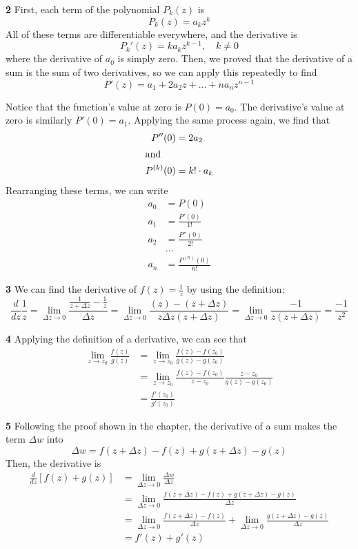 \documentclass{article}
\begin{document}
\textbf{2}
First, each term of the polynomial $P_k(z)$ is
\[
	P_k(z) = a_k z^k
\]
All of these terms are differentiable everywhere, and the derivative is
\[
	P_k'(z) = k a_k z^{k-1}, \quad	k \neq 0
\]
where the derivative of $a_0$ is simply zero. Then, we proved that the derivative of a sum is the sum of two derivatives, so we can apply this repeatedly to find
\[
	P'(z) = a_1 + 2a_2 z + \dots + na_n z^{n-1}
\]

Notice that the function's value at zero is $P(0) = a_0$. The derivative's value at zero is similarly $P'(0) = a_1$. Applying the same process again, we find that
\begin{align*}
	P''(0) &= 2a_2 \\
\intertext{and}
	P^{(k)}(0) &= k! \cdot a_k
\end{align*}
Rearranging these terms, we can write
\begin{align*}
	a_0 &= P(0) \\
	a_1 &= \frac{P'(0)}{1!} \\
	a_2 &= \frac{P''(0)}{2!} \\
	&\dots \\
	a_n &= \frac{P^{(n)}(0)}{n!} 
\end{align*}

\textbf{3}
We can find the derivative of $f(z) = \frac{1}{z}$ by using the definition:
\[
	\frac{d}{dz} \frac{1}{z}
	= \lim_{\Delta z \to 0} \frac{\frac{1}{z + \Delta z} - \frac{1}{z}}{\Delta z}
	= \lim_{\Delta z \to 0} \frac{(z) - (z + \Delta z)}{z\Delta z (z + \Delta z)}
	= \lim_{\Delta z \to 0} \frac{-1}{z (z + \Delta z)}
	= \frac{-1}{z^2}
\]

\textbf{4}
Applying the definition of a derivative, we can see that
\begin{align*}
	\lim_{z \to z_0} \frac{f(z)}{g(z)} 
	&= \lim_{z \to z_0} \frac{f(z) - f(z_0)}{g(z) - g(z_0)} \\
	&= \lim_{z \to z_0} \frac{f(z) - f(z_0)}{z - z_0} \frac{z - z_0}{g(z) - g(z_0)} \\
	&= \frac{f'(z_0)}{g'(z_0)}
\end{align*}

\textbf{5}
Following the proof shown in the chapter, the derivative of a sum makes the term $\Delta w$ into
\[
	\Delta w = f(z + \Delta z) - f(z) + g(z + \Delta z) - g(z)
\]
Then, the derivative is
\begin{align*}
	\frac{d}{dz} [f(z) + g(z)] 
	&= \lim_{\Delta z \to 0} \frac{\Delta w}{\Delta z} \\
	&= \lim_{\Delta z \to 0} \frac{f(z + \Delta z) - f(z) + g(z + \Delta z) - g(z)}{\Delta z} \\
	&= \lim_{\Delta z \to 0} \frac{f(z + \Delta z) - f(z)}{\Delta z} + \lim_{\Delta z \to 0}\frac{g(z + \Delta z) - g(z)}{\Delta z} \\
	&= f'(z) + g'(z)
\end{align*}
\end{document}
